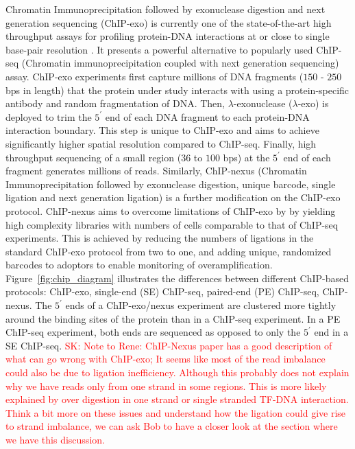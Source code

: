 \documentclass{bmcart}
\newcommand{\SK}[1]{\textcolor{red}{SK: #1}}
\begin{document}
Chromatin Immunoprecipitation followed by exonuclease
digestion and next generation sequencing (ChIP-exo) 
is currently one of the state-of-the-art high throughput assays for profiling protein-DNA interactions at or close to
single base-pair resolution \cite{exo1}. It presents a powerful alternative to popularly used ChIP-seq
(Chromatin immunoprecipitation coupled with next generation
sequencing) assay. ChIP-exo experiments first capture millions of DNA
fragments ($150$ - $250$ bps in length) that the protein under study
interacts with using  a
protein-specific antibody and random fragmentation of DNA. Then, $\lambda$-exonuclease ($\lambda$-exo) is deployed to trim the
$5^{\prime}$ end of each DNA fragment to each protein-DNA interaction boundary. This step is unique to ChIP-exo and
aims to achieve  significantly higher spatial resolution
compared to ChIP-seq. Finally, high throughput sequencing of a small
region ($36$ to $100$ bps) at the $5^{\prime}$ end of each fragment generates
millions of reads. 
 Similarly, ChIP-nexus (Chromatin Immunoprecipitation followed by exonuclease
digestion, unique barcode, single ligation and next generation
ligation)  \cite{chipnexus} is a further modification on the
ChIP-exo protocol. ChIP-nexus aims to overcome limitations of ChIP-exo by 
by yielding high complexity libraries with numbers of cells comparable to that of ChIP-seq experiments. This is achieved by reducing the numbers of ligations in the standard ChIP-exo protocol from two to one, and adding unique, randomized barcodes to adoptors to enable monitoring of overamplification. 
Figure~\ref{fig:chip_diagram} illustrates the
differences between different ChIP-based protocols: ChIP-exo, single-end (SE) ChIP-seq, paired-end
(PE) ChIP-seq, ChIP-nexus. The $5^{\prime}$ ends of a ChIP-exo/nexus experiment are clustered
more tightly around the binding sites of the protein than in a ChIP-seq
experiment. In a PE ChIP-seq experiment, both ends are sequenced as opposed to only the $5^{\prime}$ end
in a SE ChIP-seq. \SK{Note to Rene: ChIP-Nexus paper has a good description of what can go wrong with ChIP-exo; It seems like most of the read imbalance could also be due to ligation inefficiency. Although this probably does not explain why we have reads only from one strand in some regions. This is more likely explained by over digestion in one strand or single stranded TF-DNA interaction. Think a bit more on these issues and understand how the ligation could give rise to strand imbalance, we can ask Bob to have a closer look at the section where we have this discussion.}
\end{document}
